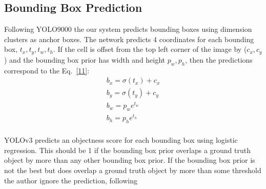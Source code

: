 \documentclass[10pt,twocolumn,letterpaper]{article}
\begin{document}
\subsection{Bounding Box Prediction}
Following YOLO9000 the our system predicts bounding boxes using dimension clusters as anchor boxes. The network predicts 4 coordinates for each bounding box, $t_x, t_y, t_w, t_h$. If the cell is offset from the top left corner of the image by ($c_x, c_y$) and the bounding box prior has width and height $p_w, p_h$, then the predictions correspond to the Eq.~\ref{11}:
\begin{equation}\label{11}
\begin{split}
b_x=\sigma(t_x)+c_x \\
b_y=\sigma(t_y)+c_y \\
b_w=p_we^{t_w} \\
b_h=p_he^{t_h} \\
\end{split}
\end{equation}
\par
YOLOv3 predicts an objectness score for each bounding box using logistic regression. This should be 1 if the bounding box prior overlaps a ground truth object by more than any other bounding box prior. If the bounding box prior is not the best but does overlap a ground truth object by more than some threshold the author ignore the prediction, following \cite{Redmon2017YOLO9000}
\end{document}
